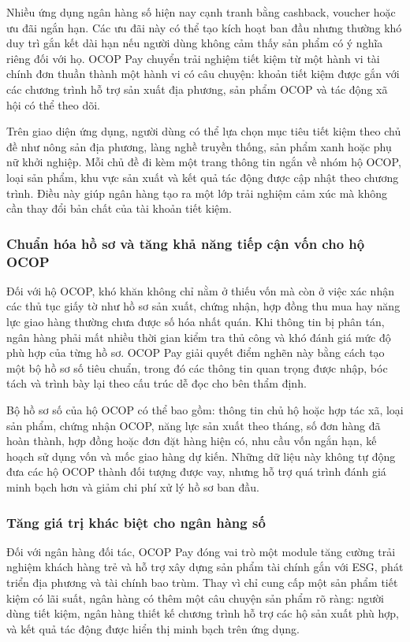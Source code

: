 \documentclass[13pt,a4paper]{extarticle}
\begin{document}
Nhiều ứng dụng ngân hàng số hiện nay cạnh tranh bằng cashback, voucher hoặc ưu đãi ngắn hạn. Các ưu đãi này có thể tạo kích hoạt ban đầu nhưng thường khó duy trì gắn kết dài hạn nếu người dùng không cảm thấy sản phẩm có ý nghĩa riêng đối với họ. OCOP Pay chuyển trải nghiệm tiết kiệm từ một hành vi tài chính đơn thuần thành một hành vi có câu chuyện: khoản tiết kiệm được gắn với các chương trình hỗ trợ sản xuất địa phương, sản phẩm OCOP và tác động xã hội có thể theo dõi.

Trên giao diện ứng dụng, người dùng có thể lựa chọn mục tiêu tiết kiệm theo chủ đề như nông sản địa phương, làng nghề truyền thống, sản phẩm xanh hoặc phụ nữ khởi nghiệp. Mỗi chủ đề đi kèm một trang thông tin ngắn về nhóm hộ OCOP, loại sản phẩm, khu vực sản xuất và kết quả tác động được cập nhật theo chương trình. Điều này giúp ngân hàng tạo ra một lớp trải nghiệm cảm xúc mà không cần thay đổi bản chất của tài khoản tiết kiệm.


\subsubsection{Chuẩn hóa hồ sơ và tăng khả năng tiếp cận vốn cho hộ OCOP}

Đối với hộ OCOP, khó khăn không chỉ nằm ở thiếu vốn mà còn ở việc xác nhận các thủ tục giấy tờ như hồ sơ sản xuất, chứng nhận, hợp đồng thu mua hay năng lực giao hàng thường chưa được số hóa nhất quán. Khi thông tin bị phân tán, ngân hàng phải mất nhiều thời gian kiểm tra thủ công và khó đánh giá mức độ phù hợp của từng hồ sơ. OCOP Pay giải quyết điểm nghẽn này bằng cách tạo một bộ hồ sơ số tiêu chuẩn, trong đó các thông tin quan trọng được nhập, bóc tách và trình bày lại theo cấu trúc dễ đọc cho bên thẩm định.

Bộ hồ sơ số của hộ OCOP có thể bao gồm: thông tin chủ hộ hoặc hợp tác xã, loại sản phẩm, chứng nhận OCOP, năng lực sản xuất theo tháng, số đơn hàng đã hoàn thành, hợp đồng hoặc đơn đặt hàng hiện có, nhu cầu vốn ngắn hạn, kế hoạch sử dụng vốn và mốc giao hàng dự kiến. Những dữ liệu này không tự động đưa các hộ OCOP thành đối tượng được vay, nhưng hỗ trợ quá trình đánh giá minh bạch hơn và giảm chi phí xử lý hồ sơ ban đầu.


\subsubsection{Tăng giá trị khác biệt cho ngân hàng số}

Đối với ngân hàng đối tác, OCOP Pay đóng vai trò một module tăng cường trải nghiệm khách hàng trẻ và hỗ trợ xây dựng sản phẩm tài chính gắn với ESG, phát triển địa phương và tài chính bao trùm. Thay vì chỉ cung cấp một sản phẩm tiết kiệm có lãi suất, ngân hàng có thêm một câu chuyện sản phẩm rõ ràng: người dùng tiết kiệm, ngân hàng thiết kế chương trình hỗ trợ các hộ sản xuất phù hợp, và kết quả tác động được hiển thị minh bạch trên ứng dụng.
\end{document}
